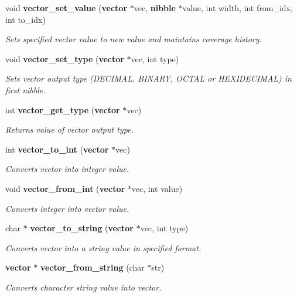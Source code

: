\begin{CompactItemize}
void {\bf vector\_\-set\_\-value} ({\bf vector} $\ast$vec, {\bf nibble} $\ast$value, int width, int from\_\-idx, int to\_\-idx)
\begin{CompactList}\small\item\em Sets specified vector value to new value and maintains coverage history.\item\end{CompactList}\item 
void {\bf vector\_\-set\_\-type} ({\bf vector} $\ast$vec, int type)
\begin{CompactList}\small\item\em Sets vector output type (DECIMAL, BINARY, OCTAL or HEXIDECIMAL) in first nibble.\item\end{CompactList}\item 
int {\bf vector\_\-get\_\-type} ({\bf vector} $\ast$vec)
\begin{CompactList}\small\item\em Returns value of vector output type.\item\end{CompactList}\item 
int {\bf vector\_\-to\_\-int} ({\bf vector} $\ast$vec)
\begin{CompactList}\small\item\em Converts vector into integer value.\item\end{CompactList}\item 
void {\bf vector\_\-from\_\-int} ({\bf vector} $\ast$vec, int value)
\begin{CompactList}\small\item\em Converts integer into vector value.\item\end{CompactList}\item 
char $\ast$ {\bf vector\_\-to\_\-string} ({\bf vector} $\ast$vec, int type)
\begin{CompactList}\small\item\em Converts vector into a string value in specified format.\item\end{CompactList}\item 
{\bf vector} $\ast$ {\bf vector\_\-from\_\-string} (char $\ast$str)
\begin{CompactList}\small\item\em Converts character string value into vector.\item\end{CompactList}\item 

\end{CompactItemize}
